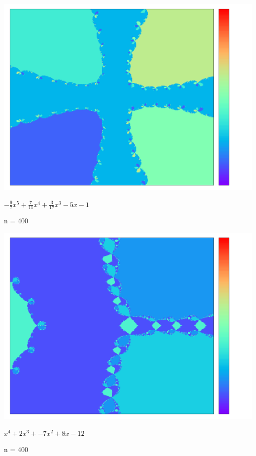 \documentclass{article}
\begin{document}
\begin{center}
\includegraphics[scale=.4]{-9:7_7:11_3:17_0_-5_-1_400.png}

\emph{$-\frac{9}{7}x^{5} + \frac{7}{11}x^{4} + \frac{3}{17}x^{3} - 5x - 1$}

n = 400

\bigskip

\includegraphics[scale=.4]{1_2_-7_8_12_400.png}

\emph{$x^{4} + 2x^{3} + -7x^{2} + 8 x - 12$}

n = 400

\bigskip


\end{center}
\end{document}
